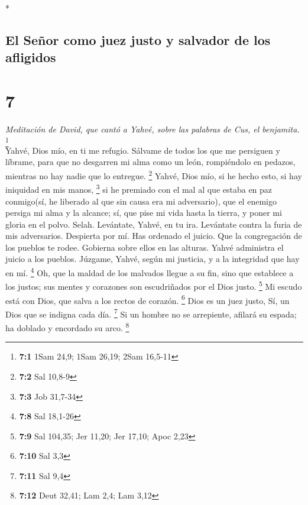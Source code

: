 \begin{paracol}{2}
\begin{otherlanguage}{english}
\end{otherlanguage}

\switchcolumn[0]*

\hypertarget{el-seuxf1or-como-juez-justo-y-salvador-de-los-afligidos}{%
\subsection{El Señor como juez justo y salvador de los
afligidos}\label{el-seuxf1or-como-juez-justo-y-salvador-de-los-afligidos}}

\hypertarget{section-12}{%
\section{7}\label{section-12}}

\emph{Meditación de David, que cantó a Yahvé, sobre las palabras de Cus,
el benjamita.} \footnote{\textbf{7:1} 1Sam 24,9; 1Sam 26,19; 2Sam
  16,5-11}\\
 Yahvé, Dios mío, en ti me refugio. Sálvame de todos los
que me persiguen y líbrame,  para que no desgarren mi alma
como un león, rompiéndolo en pedazos, mientras no hay nadie que lo
entregue. \footnote{\textbf{7:2} Sal 10,8-9}  Yahvé, Dios
mío, si he hecho esto, si hay iniquidad en mis manos, \footnote{\textbf{7:3}
  Job 31,7-34}  si he premiado con el mal al que estaba en
paz conmigo(sí, he liberado al que sin causa era mi adversario),
 que el enemigo persiga mi alma y la alcance; sí, que pise
mi vida hasta la tierra, y poner mi gloria en el polvo. Selah.
 Levántate, Yahvé, en tu ira. Levántate contra la furia de
mis adversarios. Despierta por mí. Has ordenado el juicio.
 Que la congregación de los pueblos te rodee. Gobierna
sobre ellos en las alturas.  Yahvé administra el juicio a
los pueblos. Júzgame, Yahvé, según mi justicia, y a la integridad que
hay en mí. \footnote{\textbf{7:8} Sal 18,1-26}  Oh, que la
maldad de los malvados llegue a su fin, sino que establece a los justos;
sus mentes y corazones son escudriñados por el Dios justo. \footnote{\textbf{7:9}
  Sal 104,35; Jer 11,20; Jer 17,10; Apoc 2,23}  Mi escudo
está con Dios, que salva a los rectos de corazón. \footnote{\textbf{7:10}
  Sal 3,3}  Dios es un juez justo, Sí, un Dios que se
indigna cada día. \footnote{\textbf{7:11} Sal 9,4}  Si un
hombre no se arrepiente, afilará su espada; ha doblado y encordado su
arco. \footnote{\textbf{7:12} Deut 32,41; Lam 2,4; Lam 3,12}

\end{paracol}
